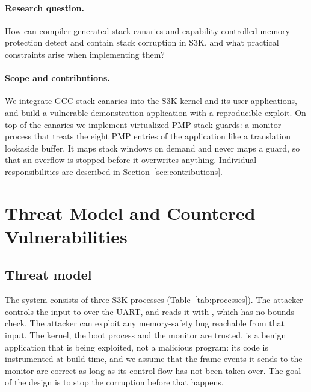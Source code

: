 \documentclass[10pt,a4paper]{article}
\newcommand{\code}[1]{\texttt{\detokenize{#1}}}
\begin{document}
\paragraph{Research question.}
How can compiler-generated stack canaries and capability-controlled memory
protection detect and contain stack corruption in S3K, and what practical
constraints arise when implementing them?

\paragraph{Scope and contributions.}
We integrate GCC stack canaries into the S3K kernel and its user
applications, and build a vulnerable demonstration application with a
reproducible exploit. On top of the canaries we implement virtualized PMP
stack guards: a monitor process that treats the eight PMP entries of the
application like a translation lookaside buffer. It maps stack windows on
demand and never maps a guard, so that an overflow is stopped before it
overwrites anything. Individual responsibilities are described in
Section~\ref{sec:contributions}.

\section{Threat Model and Countered Vulnerabilities}
\label{sec:threat}

\subsection{Threat model}

The system consists of three S3K processes (Table~\ref{tab:processes}). The
attacker controls the input to \code{vuln} over the UART, and \code{vuln}
reads it with \code{alt_gets}, which has no bounds check. The attacker can
exploit any memory-safety bug reachable from that input. The kernel, the boot
process \code{app0} and the monitor are trusted. \code{vuln} is a benign
application that is being exploited, not a malicious program: its code is
instrumented at build time, and we assume that the frame events it sends to
the monitor are correct as long as its control flow has not been taken over.
The goal of the design is to stop the corruption before that happens.
\end{document}
